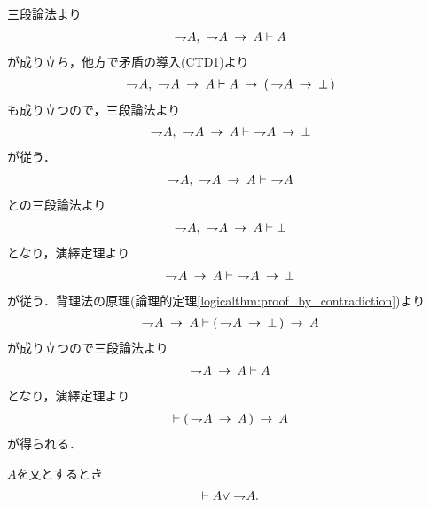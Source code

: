 	\begin{sketch}
		三段論法より
		\begin{align}
			\negation A,\ \negation A \rarrow A \vdash A
		\end{align}
		が成り立ち，他方で矛盾の導入(CTD1)より
		\begin{align}
			\negation A,\ \negation A \rarrow A
			\vdash A \rarrow (\, \negation A \rarrow \bot\, )
		\end{align}
		も成り立つので，三段論法より
		\begin{align}
			\negation A,\ \negation A \rarrow A \vdash\ \negation A \rarrow \bot
		\end{align}
		が従う．
		\begin{align}
			\negation A,\ \negation A \rarrow A \vdash\ \negation A
		\end{align}
		との三段論法より
		\begin{align}
			\negation A,\ \negation A \rarrow A \vdash \bot
		\end{align}
		となり，演繹定理より
		\begin{align}
			\negation A \rarrow A \vdash\ \negation A \rarrow \bot
		\end{align}
		が従う．背理法の原理(論理的定理\ref{logicalthm:proof_by_contradiction})より
		\begin{align}
			\negation A \rarrow A \vdash (\, \negation A \rarrow \bot\, )
			\rarrow A
		\end{align}
		が成り立つので三段論法より
		\begin{align}
			\negation A \rarrow A \vdash A
		\end{align}
		となり，演繹定理より
		\begin{align}
			\vdash (\, \negation A \rarrow A\, ) \rarrow A
		\end{align}
		が得られる．
		\QED
	\end{sketch}
	
	\begin{screen}
		\begin{logicalthm}[排中律]\label{logicalthm:law_of_excluded_middle}
			$A$を文とするとき
			\begin{align}
				\vdash A \vee \negation A.
			\end{align}
		\end{logicalthm}
	\end{screen}
	
